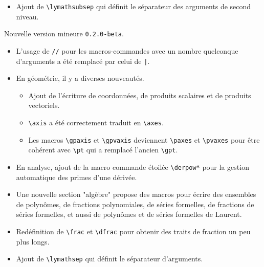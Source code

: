 \documentclass[12pt,a4paper]{article}
\begin{document}
\begin{description}[leftmargin=1em]
\begin{itemize}
\begin{itemize}
            \item De même pour les macros \verb+\vdotprod+, \verb+\vadotprod+ et \verb+\vcroosprod+.
        \end{itemize}

        \item Ajout de \verb+\lymathsubsep+ qui définit le séparateur des arguments de second niveau.
    \end{itemize}


    \item[2019-02-21] Nouvelle version mineure \verb+0.2.0-beta+.
    \begin{itemize}
        \item L'usage de \verb+//+ pour les macros-commandes avec un nombre quelconque d'arguments a été remplacé par celui de \verb+|+.

        \item En géométrie, il y a diverses nouveautés.
        \begin{itemize}
            \item Ajout de l'écriture de coordonnées, de produits scalaires et de produits vectoriels.

            \item \verb+\axis+ a été correctement traduit en \verb+\axes+.

            \item Les macros \verb+\gpaxis+ et \verb+\gpvaxis+ deviennent \verb+\paxes+ et \verb+\pvaxes+ pour être cohérent avec \verb+\pt+ qui a remplacé l'ancien \verb+\gpt+.
        \end{itemize}

        \item En analyse, ajout de la macro commande étoilée \verb+\derpow*+ pour la gestion automatique des primes d'une dérivée.

        \item Une nouvelle section "algèbre" propose des macros pour écrire des ensembles de polynômes, de fractions polynomiales, de séries formelles, de fractions de séries formelles, et aussi de polynômes et de séries formelles de Laurent.

        \item Redéfinition de \verb+\frac+ et \verb+\dfrac+ pour obtenir des traits de fraction un peu plus longs.

        \item Ajout de \verb+\lymathsep+ qui définit le séparateur d'arguments.
    \end{itemize}


\end{description}
\end{document}
